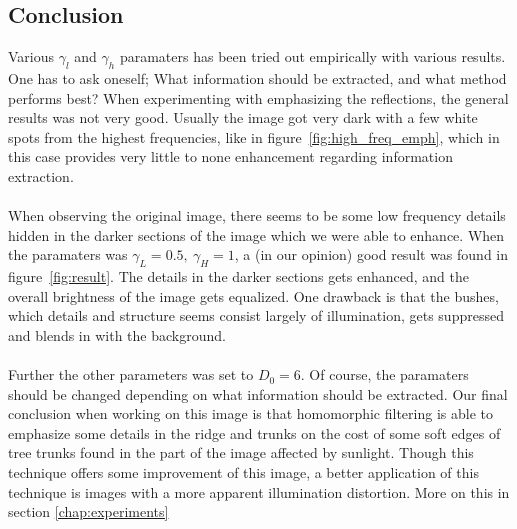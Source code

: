 		\subsection{Conclusion}
		Various $\gamma_l$ and $\gamma_h$ paramaters has been tried out empirically with 
		various results. One has to ask oneself; What information should be extracted, and what 
		method performs best? When experimenting with emphasizing the reflections, the 
		general results was not very good. Usually the image got very dark with a few white
		spots from the highest frequencies, like in figure~\ref{fig:high_freq_emph}, which
		in this case provides very little to none enhancement regarding information extraction.\\
		\\
		When observing the original image, there seems to be some 
		low frequency details hidden in the darker sections of the image which we were able
		to enhance. When the paramaters was $\gamma_L = 0.5,~\gamma_H = 1$, a (in our opinion)
		good result was 
		found in figure~\ref{fig:result}. The details in the darker sections gets enhanced, 
		and the overall brightness
		of the image gets equalized. One drawback is that the bushes, which details 
		and structure seems consist
		largely of illumination, gets suppressed and blends in with the background.\\
		\\
		Further the other parameters was set to $D_0 = 6$. Of course,
		the paramaters should be changed depending on what information should be extracted.
		Our final conclusion when working on this image is that homomorphic filtering
		is able to emphasize some details in the ridge and trunks on the cost of some soft edges of tree trunks found in the part of the image affected by sunlight. Though this technique offers some improvement of this image, a better application of this technique is images with a more apparent illumination distortion. More on this in section \ref{chap:experiments}
